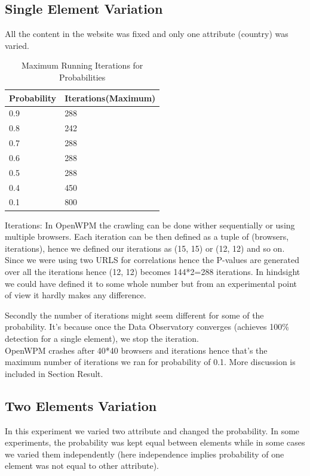 \documentclass[fleqn,12pt]{SelfArx} %
\begin{document}
\subsection{Single Element Variation}
All the content in the website was fixed and only one attribute (country) was varied.
\begin{table}[h!]
	\begin{center}
    \begin{tabular}{| l | l |}
    \hline
    Probability & Iterations(Maximum) \\ \hline
    0.9 & 288\\ \hline
    0.8 & 242\\ \hline
    0.7 & 288\\ \hline
    0.6 & 288\\ \hline
    0.5 & 288\\ \hline
    0.4 & 450\\ \hline
    0.1 & 800\\ 
    \hline
    \end{tabular}
    \caption{Maximum Running Iterations for Probabilities}
	\label{table:name}
    \end{center}
\end{table}\par
Iterations: In OpenWPM the crawling can be done wither sequentially or using multiple browsers. Each iteration can be then defined as a tuple of (browsers, iterations), hence we defined our iterations as (15, 15) or (12, 12) and so on. Since we were using two URLS for correlations hence the P-values are generated over all the iterations hence (12, 12) becomes 144*2=288 iterations.   In hindsight we could have defined it to some whole number but from an experimental point of view it hardly makes any difference. \par
Secondly the number of iterations might seem different for some of the probability. It’s because once the Data Observatory converges (achieves 100\% detection for a single element), we stop the iteration.\\
OpenWPM crashes after 40*40 browsers and iterations hence that’s the maximum number of iterations we ran for probability of 0.1. More discussion is included in Section Result.

\subsection{Two Elements Variation}
In this experiment we varied two attribute and changed the probability. In some experiments, the probability was kept equal between elements while in some cases we varied them independently (here independence implies probability of one element was not equal to other attribute).
\end{document}

